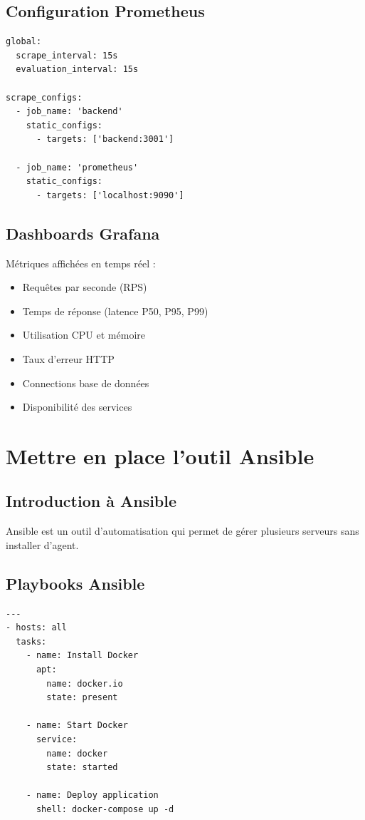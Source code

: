 \documentclass[12pt,a4paper]{report}
\begin{document}
\subsection{Configuration Prometheus}

\begin{lstlisting}
global:
  scrape_interval: 15s
  evaluation_interval: 15s

scrape_configs:
  - job_name: 'backend'
    static_configs:
      - targets: ['backend:3001']

  - job_name: 'prometheus'
    static_configs:
      - targets: ['localhost:9090']
\end{lstlisting}

\subsection{Dashboards Grafana}

Métriques affichées en temps réel :

\begin{itemize}
    \item Requêtes par seconde (RPS)
    \item Temps de réponse (latence P50, P95, P99)
    \item Utilisation CPU et mémoire
    \item Taux d'erreur HTTP
    \item Connections base de données
    \item Disponibilité des services
\end{itemize}

\section{Mettre en place l'outil Ansible}

\subsection{Introduction à Ansible}

Ansible est un outil d'automatisation qui permet de gérer plusieurs serveurs sans installer d'agent.

\subsection{Playbooks Ansible}

\begin{lstlisting}
---
- hosts: all
  tasks:
    - name: Install Docker
      apt:
        name: docker.io
        state: present

    - name: Start Docker
      service:
        name: docker
        state: started

    - name: Deploy application
      shell: docker-compose up -d
\end{lstlisting}
\end{document}
